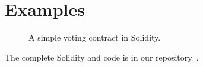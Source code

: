 \documentclass[nonacm, dvipsnames, sigconf]{acmart}
\begin{document}
\section{Examples}
\begin{figure}[!b]
    \centering
    
    \caption{A simple voting contract in Solidity.}
    \label{fig:voting-impl-sol}
\end{figure}
The complete Solidity and \langName code is in our repository~\cite{psamatheRepo}.
%         
%         
%         
%         
\end{document}
